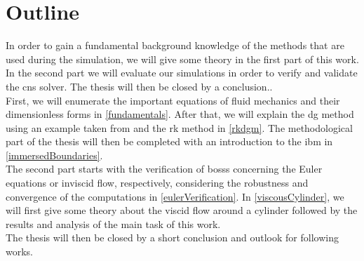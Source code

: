 \section{Outline}
In order to gain a fundamental background knowledge of the methods that are used during the simulation, we will give some theory in the first part of this work. In the second part we will evaluate our simulations in order to verify and validate the \gls{cns} solver. The thesis will then be closed by a conclusion.. \\ \indent
First, we will enumerate the important equations of fluid mechanics and their dimensionless forms in \cref{fundamentals}. After that, we will explain the \gls{dg} method using an example taken from \textcite{mueller2014} and the \gls{rk} method in  \cref{rkdgm}. The methodological part of the thesis will then be completed with an introduction to the \gls{ibm} in \cref{immersedBoundaries}. \\ \indent
The second part starts with the verification of \gls{bosss} concerning the Euler equations or inviscid flow, respectively, considering the robustness and convergence of the computations in \cref{eulerVerification}. In  \cref{viscousCylinder}, we will first give some theory about the viscid flow around a cylinder followed by the results and analysis of the main task of this work. \\ \indent
The thesis will then be closed by a short conclusion and outlook for following works.







































